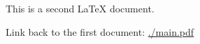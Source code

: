 \documentclass[12pt]{article}
\begin{document}
This is a second LaTeX document.

Link back to the first document: \url{./main.pdf}
\end{document}
